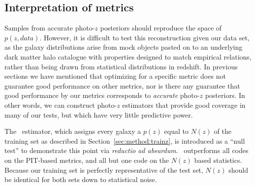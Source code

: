 



\subsection{Interpretation of metrics}\label{sec:caution}

Samples from accurate photo-$z$ posteriors should reproduce the space of $p(z, data)$. However, it is difficult to test this reconstruction given our data set, as the galaxy distributions arise from mock objects pasted on to an underlying dark matter halo catalogue with properties designed to match empirical relations, rather than being drawn from statistical distributions in redshift.  In previous sections we have mentioned that optimizing for a specific metric does not guarantee good performance on other metrics, nor is there any guarantee that good performance by our metrics corresponds to \textit{accurate} photo-$z$ posteriors.
In other words, we can construct photo-$z$ estimators that provide good coverage in many of our tests, but which have very little predictive power.


The \trainz\ estimator, which assigns every galaxy a $p(z)$ equal to $N(z)$ of the training set as described in Section~\ref{sec:method:trainz}, is introduced as a ``null test'' to demonstrate this point via \textit{reductio ad absurdum}.
\trainz\ outperforms all codes on the PIT-based metrics, and all but one code on the $N(z)$ based statistics.
Because our training set is perfectly representative of the test set, $N(z)$ should be identical for both sets down to statistical noise.

